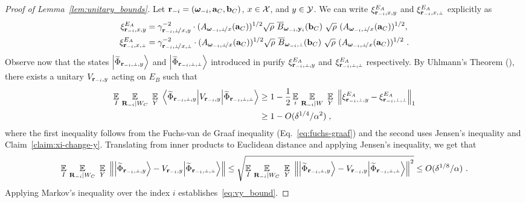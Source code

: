 \begin{proof}[Proof of Lemma~\ref{lem:unitary_bounds}]
Let $\mathbf{r}_{-i} = ({\boldsymbol{\omega}}_{-i},\mathbf{a}_C,\mathbf{b}_C)$, $x \in \mathcal{X}$, and $y \in \mathcal{Y}$. We can write $\xi^{E_A}_{\mathbf{r}_{-i} , x,y}$ and $\xi^{E_A}_\ssxp$ explicitly as 
\begin{align*}
	\xi^{E_A}_\ssxy &= \gamma_\sspxy^{-2} \cdot (A_{\bomega_\mi,\dummyx}(\ba_C))^{1/2} \sqrt{\rho} \,\, \overline{B}_{\bomega_\mi,\by_i}(\bb_C) \,\, \sqrt{\rho}\,\, (A_{\bomega_\mi,\dummyx}(\ba_C))^{1/2},\\ 
	\xi^{E_A}_\ssxp &= \gamma_\sspxp^{-2} \cdot (A_{\bomega_\mi,\dummyx}(\ba_C))^{1/2} \sqrt{\rho} \,\, \overline{B}_{\bomega_\mi,\dummy}(\bb_C) \,\, \sqrt{\rho}\,\, (A_{\bomega_\mi,\dummyx}(\ba_C))^{1/2}~.
\end{align*}
Observe now that the states $\bigket{\wt{\Phi}_\sspy}$ and $\bigket{\wt{\Phi}_\sspp}$ introduced in  purify $\xi^{E_A}_\sspy$ and $\xi^{E_A}_\sspp$ respectively. By Uhlmann's Theorem (), there exists a unitary $V_{\mathbf{r}_{-i}, y}$ acting on $E_B$ such that 
\begin{align}
	\Ex_I \, \Ex_{\bR_\mi |  W_C} \, \, \Ex_{Y} \,\,  \bigbra{\wt{\Phi}_\sspy } V_{\br_\mi, y}  \bigket{\wt{\Phi}_\sspp}  
	& \geq 1 - \frac{1}{2} \Ex_i \, \Ex_{\bR_\mi |  W} \, \, \Ex_{Y}  \,\,  \Big \| \xi^{E_A}_\sspy - \xi^{E_A}_\sspp \Big \|_1 \notag \\
	& \geq 1 - O(\delta^{1/4}/\alpha^2)\;,
\end{align}
where the first inequality follows from the Fuchs-van de Graaf inequality (Eq.~\eqref{eq:fuchs-graaf}) and the second uses Jensen's inequality and Claim~\ref{claim:xi-change-y}. Translating from inner products to Euclidean distance and applying Jensen's inequality, we get that
\[
	\Ex_I \, \Ex_{\bR_\mi |  W_C} \, \, \Ex_{Y} \,\,   \left \| \bigket{\wt{\Phi}_\sspy } - V_{\br_\mi, y}  \bigket{\wt{\Phi}_\sspp}  \right \| \leq \sqrt{\Ex_I \, \Ex_{\bR_\mi |  W_C} \, \, \Ex_{Y} \,\,   \left \| \bigket{\wt{\Phi}_\sspy } - V_{\br_\mi, y}  \bigket{\wt{\Phi}_\sspp}  \right \|^2} \leq O(\delta^{1/8}/\alpha)~.
\]
Applying Markov's inequality over the index $i$ establishes~\eqref{eq:vy_bound}.


\end{proof}
